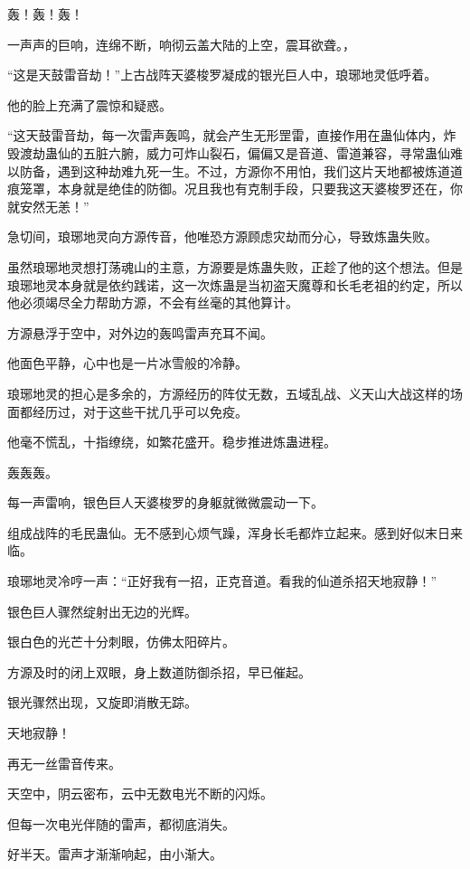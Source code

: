 
\begin{this_body}

轰！轰！轰！

一声声的巨响，连绵不断，响彻云盖大陆的上空，震耳欲聋。，

“这是天鼓雷音劫！”上古战阵天婆梭罗凝成的银光巨人中，琅琊地灵低呼着。

他的脸上充满了震惊和疑惑。

“这天鼓雷音劫，每一次雷声轰鸣，就会产生无形罡雷，直接作用在蛊仙体内，炸毁渡劫蛊仙的五脏六腑，威力可炸山裂石，偏偏又是音道、雷道兼容，寻常蛊仙难以防备，遇到这种劫难九死一生。不过，方源你不用怕，我们这片天地都被炼道道痕笼罩，本身就是绝佳的防御。况且我也有克制手段，只要我这天婆梭罗还在，你就安然无恙！”

急切间，琅琊地灵向方源传音，他唯恐方源顾虑灾劫而分心，导致炼蛊失败。

虽然琅琊地灵想打荡魂山的主意，方源要是炼蛊失败，正趁了他的这个想法。但是琅琊地灵本身就是依约践诺，这一次炼蛊是当初盗天魔尊和长毛老祖的约定，所以他必须竭尽全力帮助方源，不会有丝毫的其他算计。

方源悬浮于空中，对外边的轰鸣雷声充耳不闻。

他面色平静，心中也是一片冰雪般的冷静。

琅琊地灵的担心是多余的，方源经历的阵仗无数，五域乱战、义天山大战这样的场面都经历过，对于这些干扰几乎可以免疫。

他毫不慌乱，十指缭绕，如繁花盛开。稳步推进炼蛊进程。

轰轰轰。

每一声雷响，银色巨人天婆梭罗的身躯就微微震动一下。

组成战阵的毛民蛊仙。无不感到心烦气躁，浑身长毛都炸立起来。感到好似末日来临。

琅琊地灵冷哼一声：“正好我有一招，正克音道。看我的仙道杀招天地寂静！”

银色巨人骤然绽射出无边的光辉。

银白色的光芒十分刺眼，仿佛太阳碎片。

方源及时的闭上双眼，身上数道防御杀招，早已催起。

银光骤然出现，又旋即消散无踪。

天地寂静！

再无一丝雷音传来。

天空中，阴云密布，云中无数电光不断的闪烁。

但每一次电光伴随的雷声，都彻底消失。

好半天。雷声才渐渐响起，由小渐大。


\end{this_body}
